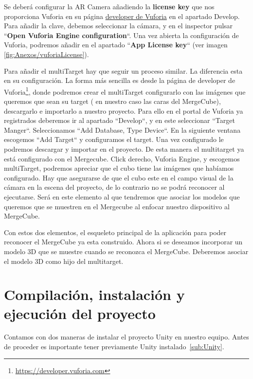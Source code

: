 Se deberá configurar la AR Camera añadiendo la \textbf{license key} que nos proporciona Vuforia en su página \href{https://developer.vuforia.com/license-manager}{developer de Vuforia} en el apartado Develop. Para añadir la clave, debemos seleccionar la cámara, y en el inspector pulsar ``\textbf{Open Vuforia Engine configuration}``. Una vez abierta la configuración de Vuforia, podremos añadir en el apartado ``\textbf{App License key}`` (ver imagen \ref{fig:Anexos/vuforiaLicense}). 



Para añadir el multiTarget hay que seguir un proceso similar. La diferencia esta en su configuración. La forma más sencilla es desde la página de developer de Vuforia\footnote{\url{https://developer.vuforia.com}}, donde podremos crear el multiTarget configurarlo con las imágenes que queremos que sean su target ( en nuestro caso las caras del MergeCube), descargarlo e importarlo a nuestro proyecto. Para ello en el portal de Vuforia ya registrados deberemos ir al apartado ``Develop``, y en este seleccionar ``Target Manger``. Seleccionamos ``Add Database, Type Device``. En la siguiente ventana escogemos ``Add Target`` y configuramos el target. Una vez configurado le podremos descargar y importar en el proyecto.
De esta manera el multitarget ya está configurado con el Mergecube.
Click derecho, Vuforia Engine, y escogemos multiTarget, podremos apreciar que el cubo tiene las imágenes que habíamos configurado. Hay que asegurarse de que el cubo este en el campo visual de la cámara en la escena del proyecto, de lo contrario no se podrá reconocer al ejecutarse. Será en este elemento al que tendremos que asociar los modelos que queremos que se muestren en el Mergecube al enfocar nuestro dispositivo al MergeCube.


Con estos dos elementos, el esqueleto principal de la aplicación para poder reconocer el MergeCube ya esta construido. Ahora si se deseamos incorporar un modelo 3D que se muestre cuando se reconozca el MergeCube. Deberemos asociar el modelo 3D como hijo del multitarget.



\section{Compilación, instalación y ejecución del proyecto}
Contamos con dos maneras de instalar el proyecto Unity en nuestro equipo. Antes de proceder es importante tener previamente Unity instalado~\ref{sub:Unity}.


